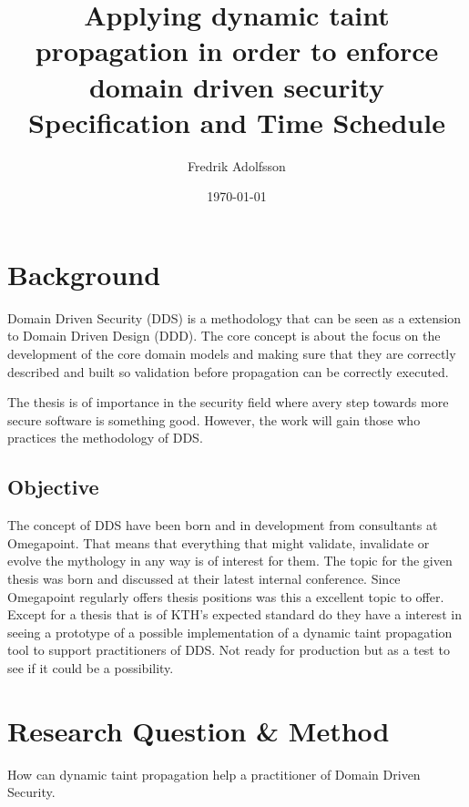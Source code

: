 \documentclass{../kththesis}
\title{Applying dynamic taint propagation in order to enforce domain driven security \\
        \large Specification and Time Schedule}
\author{Fredrik Adolfsson}
\date{\today}
\begin{document}
\frontmatter


\titlepage


\tableofcontents


\mainmatter



\chapter{Background}
Domain Driven Security (DDS) is a methodology that can be seen as a extension to Domain Driven Design (DDD). The core concept is about the focus on the development of the core domain models and making sure that they are correctly described and built so validation before propagation can be correctly executed.

The thesis is of importance in the security field where avery step towards more secure software is something good. However, the work will gain those who practices the methodology of DDS.


\section{Objective}
The concept of DDS have been born and in development from consultants at Omegapoint. That means that everything that might validate, invalidate or evolve the mythology in any way is of interest for them. The topic for the given thesis was born and discussed at their latest internal conference. Since Omegapoint regularly offers thesis positions was this a excellent topic to offer. Except for a thesis that is of KTH's expected standard do they have a interest in seeing a prototype of a possible implementation of a dynamic taint propagation tool to support practitioners of DDS. Not ready for production but as a test to see if it could be a possibility.


\chapter{Research Question \& Method}
How can dynamic taint propagation help a practitioner of Domain Driven Security.
\end{document}
